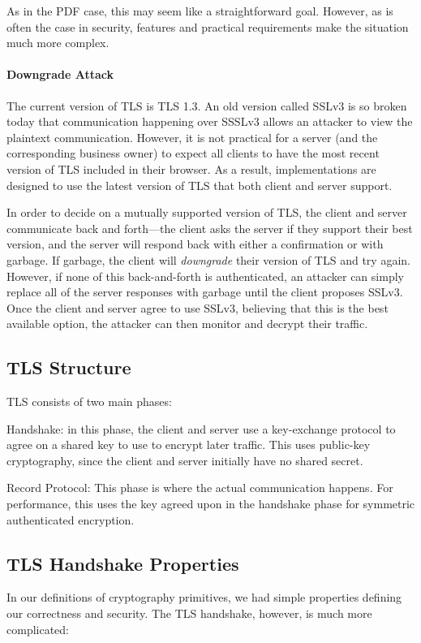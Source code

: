 As in the PDF case, this may seem like a straightforward goal. However, as is often the case in security, features and practical requirements make the situation much more complex.

\paragraph{Downgrade Attack} The current version of TLS is TLS 1.3. An old version called SSLv3 is so broken today that communication happening over SSSLv3 allows an attacker to view the plaintext communication. However, it is not practical for a server (and the corresponding business owner) to expect all clients to have the most recent version of TLS included in their browser. As a result, implementations are designed to use the latest version of TLS that both client and server support.

In order to decide on a mutually supported version of TLS, the client and server communicate back and forth---the client asks the server if they support their best version, and the server will respond back with either a confirmation or with garbage. If garbage, the client will \emph{downgrade} their version of TLS and try again. However, if none of this back-and-forth is authenticated, an attacker can simply replace all of the server responses with garbage until the client proposes SSLv3. Once the client and server agree to use SSLv3, believing that this is the best available option, the attacker can then monitor and decrypt their traffic.

\subsection{TLS Structure}
TLS consists of two main phases:
\begin{compactenum}
\item Handshake: in this phase, the client and server use a key-exchange protocol to agree on a shared key to use to encrypt later traffic. This uses public-key cryptography, since the client and server initially have no shared secret.
\item Record Protocol: This phase is where the actual communication happens. For performance, this uses the key agreed upon in the handshake phase for symmetric authenticated encryption.
\end{compactenum}

\subsection{TLS Handshake Properties}
In our definitions of cryptography primitives, we had simple properties defining our correctness and security. The TLS handshake, however, is much more complicated:

